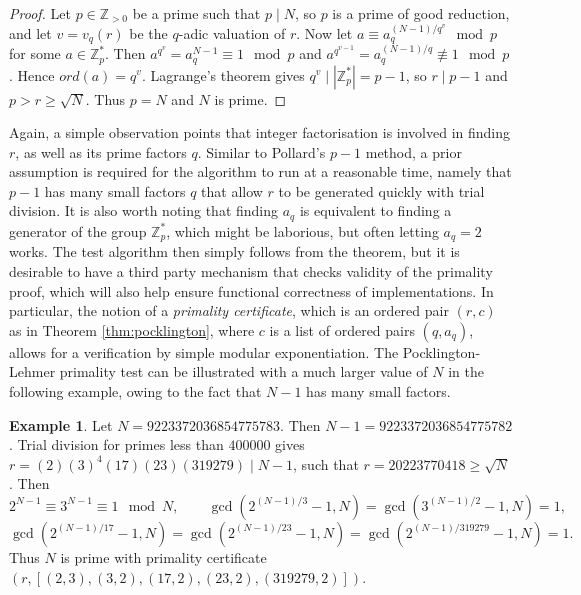 \documentclass{article}
\newcommand{\Z}{\mathbb{Z}}
\newcommand{\rb}[1]{\left( #1 \right)}
\renewcommand{\sb}[1]{\left[ #1 \right]}
\newcommand{\abs}[1]{\left\lvert #1 \right\rvert}
\theoremstyle{definition}
\newtheorem*{example}{Example}
\begin{document}
\begin{proof}
Let $ p \in \Z_{> 0} $ be a prime such that $ p \mid N $, so $ p $ is a prime of good reduction, and let $ v = v_q\rb{r} $ be the $ q $-adic valuation of $ r $. Now let $ a \equiv a_q^{\rb{N - 1} / q^v} \mod p $ for some $ a \in \Z_p^* $. Then $ a^{q^v} = a_q^{N - 1} \equiv 1 \mod p $ and $ a^{q^{v - 1}} = a_q^{\rb{N - 1} / q} \not\equiv 1 \mod p $. Hence $ ord\rb{a} = q^v $. Lagrange's theorem gives $ q^v \mid \abs{\Z_p^*} = p - 1 $, so $ r \mid p - 1 $ and $ p > r \ge \sqrt{N} $. Thus $ p = N $ and $ N $ is prime.
\end{proof}

Again, a simple observation points that integer factorisation is involved in finding $ r $, as well as its prime factors $ q $. Similar to Pollard's $ p - 1 $ method, a prior assumption is required for the algorithm to run at a reasonable time, namely that $ p - 1 $ has many small factors $ q $ that allow $ r $ to be generated quickly with trial division. It is also worth noting that finding $ a_q $ is equivalent to finding a generator of the group $ \Z_p^* $, which might be laborious, but often letting $ a_q = 2 $ works. The test algorithm then simply follows from the theorem, but it is desirable to have a third party mechanism that checks validity of the primality proof, which will also help ensure functional correctness of implementations. In particular, the notion of a \emph{primality certificate}, which is an ordered pair $ \rb{r, c} $ as in Theorem \ref{thm:pocklington}, where $ c $ is a list of ordered pairs $ \rb{q, a_q} $, allows for a verification by simple modular exponentiation. The Pocklington-Lehmer primality test can be illustrated with a much larger value of $ N $ in the following example, owing to the fact that $ N - 1 $ has many small factors.

\begin{example}
Let $ N = 9223372036854775783 $. Then $ N - 1 = 9223372036854775782 $. Trial division for primes less than $ 400000 $ gives $ r = \rb{2}\rb{3}^4\rb{17}\rb{23}\rb{319279} \mid N - 1 $, such that $ r = 20223770418 \ge \sqrt{N} $. Then
$$ 2^{N - 1} \equiv 3^{N - 1} \equiv 1 \mod N, \qquad \gcd\rb{2^{\rb{N - 1} / 3} - 1, N} = \gcd\rb{3^{\rb{N - 1} / 2} - 1, N} = 1, $$
$$ \gcd\rb{2^{\rb{N - 1} / 17} - 1, N} = \gcd\rb{2^{\rb{N - 1} / 23} - 1, N} = \gcd\rb{2^{\rb{N - 1} / 319279} - 1, N} = 1. $$
Thus $ N $ is prime with primality certificate $ \rb{r, \sb{\rb{2, 3}, \rb{3, 2}, \rb{17, 2}, \rb{23, 2}, \rb{319279, 2}}} $.
\end{example}
\end{document}
